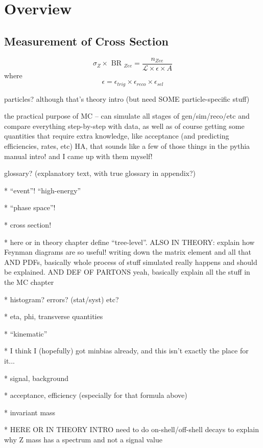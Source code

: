 \chapter{Overview}
\label{over}
\section{Measurement of Cross Section}
\label{over:xsec}
\[
\sigma_{ Z } \times \textrm{ BR }_{ Zee } = \frac{ n_{ Zee } }{  \mathcal{ L } \times \epsilon \times A}
\]
where
\[
\epsilon = \epsilon_{ trig } \times \epsilon_{ reco } \times \epsilon_{ sel }
\]

particles?  although that's theory intro (but need SOME particle-specific stuff) 

the practical purpose of MC -- can simulate all stages of gen/sim/reco/etc and compare 
everything step-by-step with data, as well as of course getting some quantities 
that require extra knowledge, like acceptance (and predicting efficiencies, rates, etc)
HA, that sounds like a few of those things in the pythia manual intro!  and I came 
up with them myself!  

glossary? (explanatory text, with true glossary in appendix?)  

   * ``event''!  ``high-energy''

   * ``phase space''!

   * cross section!

   * here or in theory chapter define ``tree-level''.  
ALSO IN THEORY: explain how Feynman diagrams are so useful! 
writing down the matrix element and all that
AND PDFs, basically whole process of stuff simulated 
really happens and should be explained.  
AND DEF OF PARTONS
yeah, basically explain all the stuff in the MC chapter

   * histogram?  errors? (stat/syst) etc?

   * eta, phi, transverse quantities

   * ``kinematic''

   * I think I (hopefully) got minbias already, and this isn't exactly the place for it... 

   * signal, background

   * acceptance, efficiency (especially for that formula above)

   * invariant mass

   * HERE OR IN THEORY INTRO need to do on-shell/off-shell decays 
to explain why Z mass has a spectrum and not a signal value

